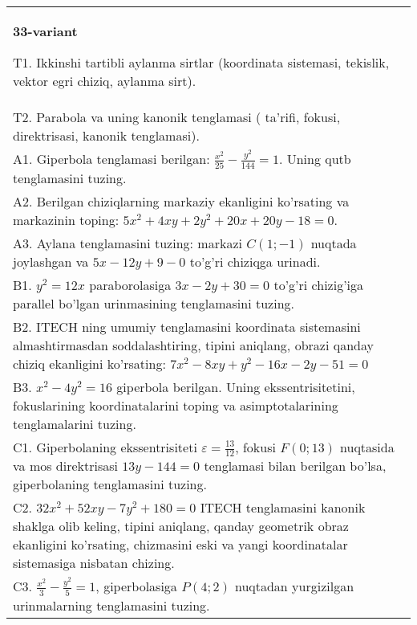 \documentclass{article}
\begin{document}
\begin{tabular}{m{17cm}}
\textbf{33-variant}
\newline

T1. Ikkinshi tartibli aylanma sirtlar (koordinata sistemasi, tekislik, vektor egri chiziq, aylanma sirt).\\

T2. Parabola va uning kanonik tenglamasi ( ta'rifi, fokusi, direktrisasi, kanonik tenglamasi).\\

A1. Giperbola tenglamasi berilgan: $\frac{x^{2}}{25}-\frac{y^{2}}{144}=1$. Uning qutb tenglamasini tuzing.\\

A2. Berilgan chiziqlarning markaziy ekanligini ko'rsating va markazinin toping: $5x^{2}+4xy+2y^{2}+20x+20y-18=0$.\\

A3. Aylana tenglamasini tuzing: markazi $C(1;-1)$ nuqtada joylashgan va $5x-12y+9-0$ to'g'ri chiziqga urinadi.\\

B1. $y^{2} = 12x$ paraborolasiga $3x - 2y + 30 = 0$ to'g'ri chizig'iga parallel bo'lgan urinmasining tenglamasini tuzing.  \\

B2. ITECH ning umumiy tenglamasini koordinata sistemasini almashtirmasdan soddalashtiring, tipini aniqlang, obrazi qanday chiziq ekanligini ko'rsating: $7x^{2} - 8xy + y^{2} - 16x - 2y - 51 = 0$\\

B3. $x^{2} - 4y^{2} = 16$ giperbola berilgan. Uning ekssentrisitetini, fokuslarining koordinatalarini toping va asimptotalarining tenglamalarini tuzing.\\

C1. Giperbolaning ekssentrisiteti $\varepsilon = \frac{13}{12}$, fokusi $F(0;13)$ nuqtasida va mos direktrisasi $13y - 144 = 0$ tenglamasi bilan berilgan bo'lsa, giperbolaning tenglamasini tuzing.  \\

C2. $32x^{2} + 52xy - 7y^{2} + 180 = 0$ ITECH tenglamasini kanonik shaklga olib keling, tipini aniqlang, qanday geometrik obraz ekanligini ko'rsating, chizmasini eski va yangi koordinatalar sistemasiga nisbatan chizing.  \\

C3. $\frac{x^{2}}{3} - \frac{y^{2}}{5} = 1$, giperbolasiga $P(4;2)$ nuqtadan yurgizilgan urinmalarning tenglamasini tuzing.  \\

\end{tabular}
\vspace{1cm}
\end{document}
